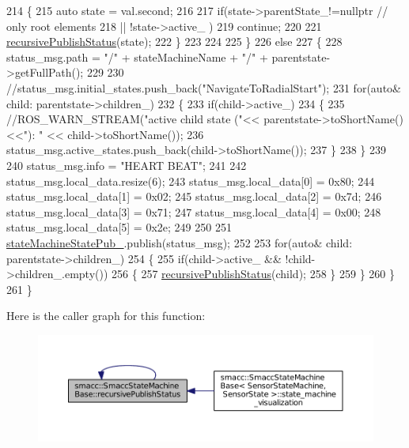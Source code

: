 \begin{DoxyCode}
214             \{
215                 \textcolor{keyword}{auto} state = val.second;
216 
217                 \textcolor{keywordflow}{if}(state->parentState\_!=\textcolor{keyword}{nullptr} \textcolor{comment}{// only root elements}
218                     || !state->active\_ )
219                         \textcolor{keywordflow}{continue};     
220 
221                 \hyperlink{structsmacc_1_1SmaccStateMachineBase_a5c078ef0eec2c64ecd9a31b46341b13c}{recursivePublishStatus}(state);
222             \}
223 
224 
225         \}
226         \textcolor{keywordflow}{else}
227         \{
228             status\_msg.path = \textcolor{stringliteral}{"/"} + stateMachineName + \textcolor{stringliteral}{"/"} + parentstate->getFullPath();
229 
230             \textcolor{comment}{//status\_msg.initial\_states.push\_back("NavigateToRadialStart");}
231             \textcolor{keywordflow}{for}(\textcolor{keyword}{auto}& child: parentstate->children\_)
232             \{
233                 \textcolor{keywordflow}{if}(child->active\_)
234                 \{
235                     \textcolor{comment}{//ROS\_WARN\_STREAM("active child state ("<< parentstate->toShortName()<<"): " <<
       child->toShortName());}
236                     status\_msg.active\_states.push\_back(child->toShortName());
237                 \}
238             \}
239 
240              status\_msg.info = \textcolor{stringliteral}{"HEART BEAT"};
241         
242             status\_msg.local\_data.resize(6);
243             status\_msg.local\_data[0] = 0x80;
244             status\_msg.local\_data[1] = 0x02;
245             status\_msg.local\_data[2] = 0x7d;
246             status\_msg.local\_data[3] = 0x71;
247             status\_msg.local\_data[4] = 0x00;
248             status\_msg.local\_data[5] = 0x2e;
249 
250 
251             \hyperlink{structsmacc_1_1SmaccStateMachineBase_a7c76e7a7d6c00d9831472297ff51e38c}{stateMachineStatePub\_}.publish(status\_msg);
252 
253             \textcolor{keywordflow}{for}(\textcolor{keyword}{auto}& child: parentstate->children\_)
254             \{
255                 \textcolor{keywordflow}{if}(child->active\_ && !child->children\_.empty())
256                 \{
257                     \hyperlink{structsmacc_1_1SmaccStateMachineBase_a5c078ef0eec2c64ecd9a31b46341b13c}{recursivePublishStatus}(child);
258                 \}
259             \}
260         \}
261     \}
\end{DoxyCode}


Here is the caller graph for this function\+:
\nopagebreak
\begin{figure}[H]
\begin{center}
\leavevmode
\includegraphics[width=350pt]{structsmacc_1_1SmaccStateMachineBase_a5c078ef0eec2c64ecd9a31b46341b13c_icgraph}
\end{center}
\end{figure}


